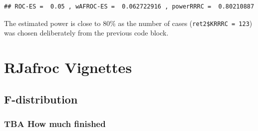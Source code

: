 \documentclass[
]{book}
\newenvironment{Shaded}{\begin{snugshade}}{\end{snugshade}}
\newcommand{\CharTok}[1]{\textcolor[rgb]{0.31,0.60,0.02}{#1}}
\newcommand{\DataTypeTok}[1]{\textcolor[rgb]{0.13,0.29,0.53}{#1}}
\newcommand{\DecValTok}[1]{\textcolor[rgb]{0.00,0.00,0.81}{#1}}
\newcommand{\KeywordTok}[1]{\textcolor[rgb]{0.13,0.29,0.53}{\textbf{#1}}}
\newcommand{\NormalTok}[1]{#1}
\newcommand{\OperatorTok}[1]{\textcolor[rgb]{0.81,0.36,0.00}{\textbf{#1}}}
\newcommand{\OtherTok}[1]{\textcolor[rgb]{0.56,0.35,0.01}{#1}}
\newcommand{\StringTok}[1]{\textcolor[rgb]{0.31,0.60,0.02}{#1}}
\begin{document}
\begin{Shaded}
\end{Shaded}

\begin{verbatim}
## ROC-ES =  0.05 , wAFROC-ES =  0.062722916 , powerRRRC =  0.80210887
\end{verbatim}

The estimated power is close to 80\% as the number of cases (\texttt{ret2\$KRRRC\ =\ 123}) was chosen deliberately from the previous code block.

\hypertarget{part-rjafroc-vignettes}{%
\part*{RJafroc Vignettes}\label{part-rjafroc-vignettes}}

\hypertarget{background-f-distribution}{%
\chapter{F-distribution}\label{background-f-distribution}}

\hypertarget{background-f-distribution-how-much-finished}{%
\section{TBA How much finished}\label{background-f-distribution-how-much-finished}}
\end{document}
